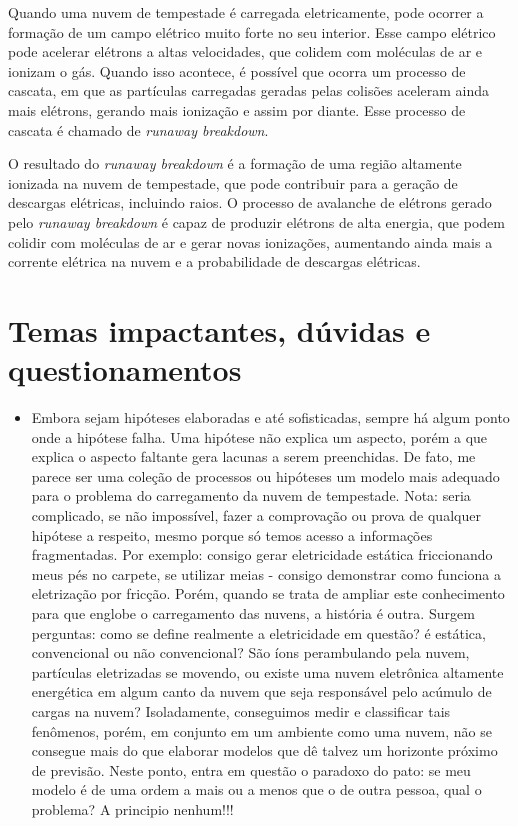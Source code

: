 \documentclass[a4paper, 12pt, onecolumn,singlespacing]{article}
\begin{document}
\begin{itemize}
		Quando uma nuvem de tempestade é carregada eletricamente, pode ocorrer a formação de um campo elétrico muito forte no seu interior. Esse campo elétrico pode acelerar elétrons a altas velocidades, que colidem com moléculas de ar e ionizam o gás. Quando isso acontece, é possível que ocorra um processo de cascata, em que as partículas carregadas geradas pelas colisões aceleram ainda mais elétrons, gerando mais ionização e assim por diante. Esse processo de cascata é chamado de \textit{runaway breakdown}.
		
		O resultado do \textit{runaway breakdown} é a formação de uma região altamente ionizada na nuvem de tempestade, que pode contribuir para a geração de descargas elétricas, incluindo raios. O processo de avalanche de elétrons gerado pelo \textit{runaway breakdown }é capaz de produzir elétrons de alta energia, que podem colidir com moléculas de ar e gerar novas ionizações, aumentando ainda mais a corrente elétrica na nuvem e a probabilidade de descargas elétricas.
		
	\end{itemize}
	\section{Temas impactantes, dúvidas e questionamentos}
	\begin{itemize}
		\item Embora sejam hipóteses elaboradas e até sofisticadas, sempre há algum ponto onde a hipótese falha. Uma hipótese não explica um aspecto, porém a que explica o aspecto faltante gera lacunas a serem preenchidas. De fato, me parece ser uma coleção de processos ou hipóteses um modelo mais adequado para o problema do carregamento da nuvem de tempestade. Nota: seria complicado, se não impossível, fazer a comprovação ou prova de qualquer hipótese a respeito, mesmo porque só temos acesso a informações fragmentadas. Por exemplo: consigo gerar eletricidade estática friccionando meus pés no carpete, se utilizar meias - consigo demonstrar como funciona a eletrização por fricção. Porém, quando se trata de ampliar este conhecimento para que englobe o carregamento das nuvens, a história é outra. Surgem perguntas: como se define realmente a eletricidade em questão? é estática, convencional ou não convencional? São íons perambulando pela nuvem, partículas eletrizadas se movendo, ou existe uma nuvem eletrônica altamente energética em algum canto da nuvem que seja responsável pelo acúmulo de cargas na nuvem? Isoladamente, conseguimos medir e classificar tais fenômenos, porém, em conjunto em um ambiente como uma nuvem, não se consegue mais do que elaborar modelos que dê talvez um horizonte próximo de previsão. Neste ponto, entra em questão o paradoxo do pato: se meu modelo é de uma ordem a mais ou a menos que o de outra pessoa, qual o problema? A principio nenhum!!!
	\end{itemize}
	
\end{document}
